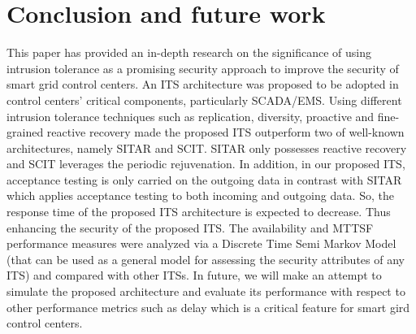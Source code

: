 \documentclass[preprint,number,12pt]{elsarticle}
\begin{document}
\section{Conclusion and future work} \label{sec: conclusion}
This paper has provided an in-depth research on the significance of using intrusion tolerance as a promising security approach to improve the security of smart grid control centers. An ITS architecture was proposed to be adopted in control centers' critical components, particularly SCADA/EMS. Using different intrusion tolerance techniques such as replication, diversity, proactive and fine-grained reactive recovery made the proposed ITS outperform two of well-known architectures, namely SITAR and SCIT. SITAR only possesses reactive recovery and SCIT leverages the periodic rejuvenation. In addition, in our proposed ITS, acceptance testing is only carried on the outgoing data in contrast with SITAR which applies acceptance testing to both incoming and outgoing data. So, the response time of the proposed ITS architecture is expected to decrease. Thus enhancing the security of the proposed ITS. The availability and MTTSF performance measures were analyzed via a Discrete Time Semi Markov Model (that can be used as a general model for assessing the security attributes of any ITS) and compared with other ITSs. In future, we will make an attempt to simulate the proposed  architecture and evaluate its performance with respect to other performance metrics such as delay which is a critical feature for smart gird control centers.
\end{document}
